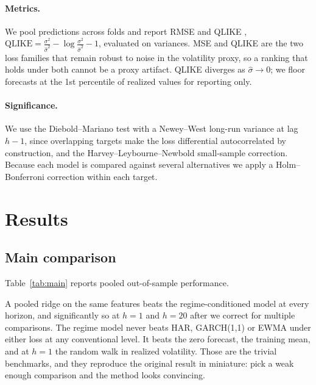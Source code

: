 \documentclass[sigconf,nonacm]{acmart}
\begin{document}
\paragraph{Metrics.}
We pool predictions across folds and report RMSE and QLIKE
\cite{patton2011},
$\mathrm{QLIKE} = \frac{\sigma^2}{\hat\sigma^2} - \log\frac{\sigma^2}{\hat\sigma^2} - 1$,
evaluated on variances. MSE and QLIKE are the two loss families that remain
robust to noise in the volatility proxy, so a ranking that holds under both
cannot be a proxy artifact. QLIKE diverges as $\hat\sigma \to 0$; we floor
forecasts at the 1st percentile of realized values for reporting only.

\paragraph{Significance.}
We use the Diebold--Mariano test \cite{dieboldmariano1995} with a
Newey--West \cite{neweywest1987} long-run variance at lag $h-1$, since
overlapping targets make the loss differential autocorrelated by construction,
and the Harvey--Leybourne--Newbold \cite{harvey1997} small-sample correction.
Because each model is compared against several alternatives we apply a
Holm--Bonferroni correction within each target.

\section{Results}
\label{sec:results}

\subsection{Main comparison}



Table~\ref{tab:main} reports pooled out-of-sample performance.

A pooled ridge on the same features beats the regime-conditioned model at every
horizon, and significantly so at $h=1$ and $h=20$ after we correct for multiple
comparisons. The regime model never beats HAR, GARCH(1,1) or EWMA under either
loss at any conventional level. It beats the zero forecast, the training mean,
and at $h=1$ the random walk in realized volatility. Those are the trivial
benchmarks, and they reproduce the original result in miniature: pick a weak
enough comparison and the method looks convincing.
\end{document}
